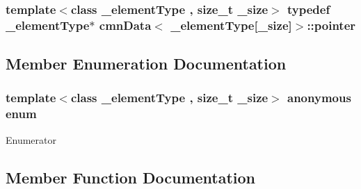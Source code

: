 \subsubsection[{pointer}]{\setlength{\rightskip}{0pt plus 5cm}template$<$class \+\_\+element\+Type , size\+\_\+t \+\_\+size$>$ typedef \+\_\+element\+Type$\ast$ {\bf cmn\+Data}$<$ \+\_\+element\+Type\mbox{[}\+\_\+size\mbox{]}$>$\+::{\bf pointer}}\label{classcmn_data_3_01__element_type[__size]_4_ad12f77b67872d7ed06978b393bc3d29e}


\subsection{Member Enumeration Documentation}
\hypertarget{classcmn_data_3_01__element_type[__size]_4_a9d637558f427f9c59075d571e6f9ac5f}{}\subsubsection[{anonymous enum}]{\setlength{\rightskip}{0pt plus 5cm}template$<$class \+\_\+element\+Type , size\+\_\+t \+\_\+size$>$ anonymous enum}\label{classcmn_data_3_01__element_type[__size]_4_a9d637558f427f9c59075d571e6f9ac5f}
\begin{Desc}
\item[Enumerator]\par
\begin{description}
\item[{\em 
\hypertarget{classcmn_data_3_01__element_type[__size]_4_a9d637558f427f9c59075d571e6f9ac5fa11da30d776c8987ce057d7265b627227}{}I\+S\+\_\+\+S\+P\+E\+C\+I\+A\+L\+I\+Z\+E\+D\label{classcmn_data_3_01__element_type[__size]_4_a9d637558f427f9c59075d571e6f9ac5fa11da30d776c8987ce057d7265b627227}
}]\end{description}
\end{Desc}


\subsection{Member Function Documentation}
\hypertarget{classcmn_data_3_01__element_type[__size]_4_af9e38a0f19a8ec2923befe529dec2677}{}
